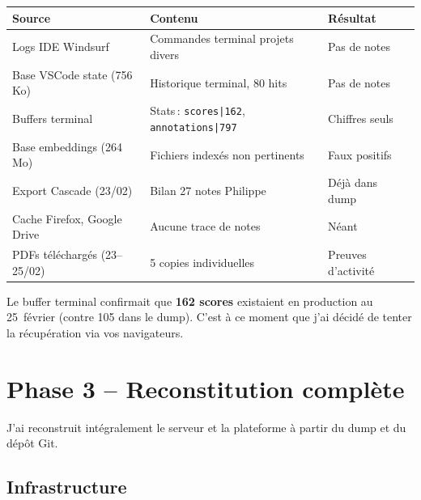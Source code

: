 \documentclass[11pt,a4paper]{article}
\begin{document}
\begin{center}
	\renewcommand{\arraystretch}{1.2}
	\small
	\begin{tabularx}{\linewidth}{lXl}
		\toprule
		\rowcolor{grisFond}
		\textbf{\sffamily Source}                & \textbf{\sffamily Contenu}                             & \textbf{\sffamily R\'{e}sultat} \\
		\midrule
		Logs IDE Windsurf                        & Commandes terminal projets divers                      & Pas de notes                    \\
		\midrule
		Base VSCode state (756\,Ko)              & Historique terminal, 80 hits                           & Pas de notes                    \\
		\midrule
		Buffers terminal                         & Stats\,: \texttt{scores|162}, \texttt{annotations|797} & Chiffres seuls                  \\
		\midrule
		Base embeddings (264\,Mo)                & Fichiers index\'{e}s non pertinents                    & Faux positifs                   \\
		\midrule
		Export Cascade (23/02)                   & Bilan 27 notes Philippe                                & D\'{e}j\`{a} dans dump          \\
		\midrule
		Cache Firefox, Google Drive              & Aucune trace de notes                                  & N\'{e}ant                       \\
		\midrule
		PDFs t\'{e}l\'{e}charg\'{e}s (23--25/02) & 5 copies individuelles                                 & Preuves d'activit\'{e}          \\
		\bottomrule
	\end{tabularx}
\end{center}

Le buffer terminal confirmait que \textbf{162 scores} existaient en production au 25~f\'{e}vrier (contre 105 dans le dump). C'est \`{a} ce moment que j'ai d\'{e}cid\'{e} de tenter la r\'{e}cup\'{e}ration via vos navigateurs.

\section{Phase 3 -- Reconstitution compl\`{e}te}

J'ai reconstruit int\'{e}gralement le serveur et la plateforme \`{a} partir du dump et du d\'{e}p\^{o}t Git.

\subsection{Infrastructure}
\end{document}
